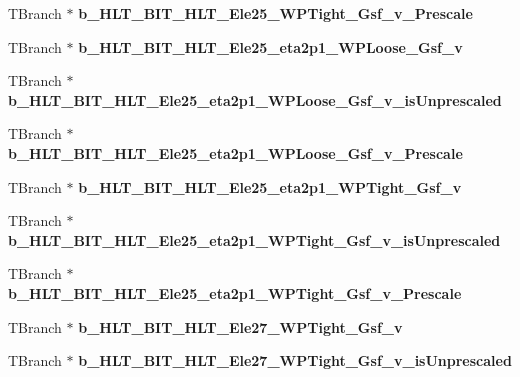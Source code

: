 \begin{DoxyCompactItemize}
T\+Branch $\ast$ {\bfseries b\+\_\+\+H\+L\+T\+\_\+\+B\+I\+T\+\_\+\+H\+L\+T\+\_\+\+Ele25\+\_\+\+W\+P\+Tight\+\_\+\+Gsf\+\_\+v\+\_\+\+Prescale}
\item 
\hypertarget{classMiniTree_a735374ece21a9f61131df3366513ef14}{}\label{classMiniTree_a735374ece21a9f61131df3366513ef14} 
T\+Branch $\ast$ {\bfseries b\+\_\+\+H\+L\+T\+\_\+\+B\+I\+T\+\_\+\+H\+L\+T\+\_\+\+Ele25\+\_\+eta2p1\+\_\+\+W\+P\+Loose\+\_\+\+Gsf\+\_\+v}
\item 
\hypertarget{classMiniTree_af2d7a5af610e1daa0c230eaeecd7815a}{}\label{classMiniTree_af2d7a5af610e1daa0c230eaeecd7815a} 
T\+Branch $\ast$ {\bfseries b\+\_\+\+H\+L\+T\+\_\+\+B\+I\+T\+\_\+\+H\+L\+T\+\_\+\+Ele25\+\_\+eta2p1\+\_\+\+W\+P\+Loose\+\_\+\+Gsf\+\_\+v\+\_\+is\+Unprescaled}
\item 
\hypertarget{classMiniTree_a5fca12a53131a94d862d223a5810c691}{}\label{classMiniTree_a5fca12a53131a94d862d223a5810c691} 
T\+Branch $\ast$ {\bfseries b\+\_\+\+H\+L\+T\+\_\+\+B\+I\+T\+\_\+\+H\+L\+T\+\_\+\+Ele25\+\_\+eta2p1\+\_\+\+W\+P\+Loose\+\_\+\+Gsf\+\_\+v\+\_\+\+Prescale}
\item 
\hypertarget{classMiniTree_a63ad8dcad79456f57fbe6f4ecb0f2f74}{}\label{classMiniTree_a63ad8dcad79456f57fbe6f4ecb0f2f74} 
T\+Branch $\ast$ {\bfseries b\+\_\+\+H\+L\+T\+\_\+\+B\+I\+T\+\_\+\+H\+L\+T\+\_\+\+Ele25\+\_\+eta2p1\+\_\+\+W\+P\+Tight\+\_\+\+Gsf\+\_\+v}
\item 
\hypertarget{classMiniTree_a861ceaa984b4456f2342b74e590e11a9}{}\label{classMiniTree_a861ceaa984b4456f2342b74e590e11a9} 
T\+Branch $\ast$ {\bfseries b\+\_\+\+H\+L\+T\+\_\+\+B\+I\+T\+\_\+\+H\+L\+T\+\_\+\+Ele25\+\_\+eta2p1\+\_\+\+W\+P\+Tight\+\_\+\+Gsf\+\_\+v\+\_\+is\+Unprescaled}
\item 
\hypertarget{classMiniTree_a17d9973cea9b2ba4661a182f92375673}{}\label{classMiniTree_a17d9973cea9b2ba4661a182f92375673} 
T\+Branch $\ast$ {\bfseries b\+\_\+\+H\+L\+T\+\_\+\+B\+I\+T\+\_\+\+H\+L\+T\+\_\+\+Ele25\+\_\+eta2p1\+\_\+\+W\+P\+Tight\+\_\+\+Gsf\+\_\+v\+\_\+\+Prescale}
\item 
\hypertarget{classMiniTree_a0f005b1073ca7a4c8265b886146f5005}{}\label{classMiniTree_a0f005b1073ca7a4c8265b886146f5005} 
T\+Branch $\ast$ {\bfseries b\+\_\+\+H\+L\+T\+\_\+\+B\+I\+T\+\_\+\+H\+L\+T\+\_\+\+Ele27\+\_\+\+W\+P\+Tight\+\_\+\+Gsf\+\_\+v}
\item 
\hypertarget{classMiniTree_a4c6247f487c633a1b541bd96f72b473a}{}\label{classMiniTree_a4c6247f487c633a1b541bd96f72b473a} 
T\+Branch $\ast$ {\bfseries b\+\_\+\+H\+L\+T\+\_\+\+B\+I\+T\+\_\+\+H\+L\+T\+\_\+\+Ele27\+\_\+\+W\+P\+Tight\+\_\+\+Gsf\+\_\+v\+\_\+is\+Unprescaled}

\end{DoxyCompactItemize}
